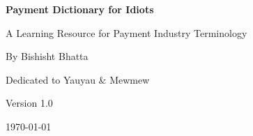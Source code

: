 \begin{titlepage}
    \centering
    \vspace*{2cm}

    {\Huge\bfseries Payment Dictionary for Idiots\par}
    \vspace{1cm}
    {\Large A Learning Resource for Payment Industry Terminology\par}
    \vspace{1.2cm}
    {\large By Bishisht Bhatta\par}
    \vspace{0.6cm}
    {\large Dedicated to Yauyau \& Mewmew\par}
    \vspace{2cm}

    \vfill

    {\large Version 1.0\par}
    {\large \today\par}
\end{titlepage}
